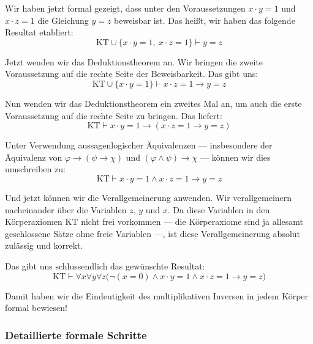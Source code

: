 \begin{spoken-clean}[01:14:42 - 01:17:42]
Wir haben jetzt formal gezeigt, dass unter den Voraussetzungen $x \cdot y = 1$ und $x \cdot z = 1$ die Gleichung $y = z$ beweisbar ist. Das heißt, wir haben das folgende Resultat etabliert:
\[ \text{KT} \cup \{x \cdot y = 1, \ x \cdot z = 1\} \vdash y = z \]

Jetzt wenden wir das Deduktionstheorem an. Wir bringen die zweite Voraussetzung auf die rechte Seite der Beweisbarkeit. Das gibt uns:
\[ \text{KT} \cup \{x \cdot y = 1\} \vdash x \cdot z = 1 \rightarrow y = z \]

Nun wenden wir das Deduktionstheorem ein zweites Mal an, um auch die erste Voraussetzung auf die rechte Seite zu bringen. Das liefert:
\[ \text{KT} \vdash x \cdot y = 1 \rightarrow (x \cdot z = 1 \rightarrow y = z) \]

Unter Verwendung aussagenlogischer Äquivalenzen --- insbesondere der Äquivalenz von $\varphi \rightarrow (\psi \rightarrow \chi)$ und $(\varphi \wedge \psi) \rightarrow \chi$ --- können wir dies umschreiben zu:
\[ \text{KT} \vdash x \cdot y = 1 \wedge x \cdot z = 1 \rightarrow y = z \]

Und jetzt können wir die Verallgemeinerung anwenden. Wir verallgemeinern nacheinander über die Variablen $z$, $y$ und $x$. Da diese Variablen in den Körperaxiomen $\text{KT}$ nicht frei vorkommen --- die Körperaxiome sind ja allesamt geschlossene Sätze ohne freie Variablen ---, ist diese Verallgemeinerung absolut zulässig und korrekt.

Das gibt uns schlussendlich das gewünschte Resultat:
\[ \text{KT} \vdash \forall x \forall y \forall z \bigl(\neg(x = 0) \wedge x \cdot y = 1 \wedge x \cdot z = 1 \rightarrow y = z\bigr) \]

Damit haben wir die Eindeutigkeit des multiplikativen Inversen in jedem Körper formal bewiesen!
\end{spoken-clean}

\subsubsection{Detaillierte formale Schritte}

